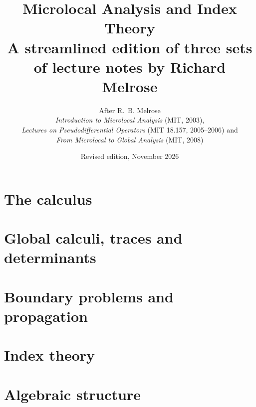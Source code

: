 \documentclass[11pt,openany]{book}
\title{Microlocal Analysis and Index Theory\\[1ex]\large A streamlined edition of three sets of lecture notes by Richard Melrose}
\author{After R.~B. Melrose\\\small \emph{Introduction to Microlocal Analysis} (MIT, 2003),\\\small \emph{Lectures on Pseudodifferential Operators} (MIT 18.157, 2005--2006) and\\\small \emph{From Microlocal to Global Analysis} (MIT, 2008)}
\date{Revised edition, November 2026}
\begin{document}
\frontmatter
\maketitle
\tableofcontents


\mainmatter
\part{The calculus}







\part{Global calculi, traces and determinants}



\part{Boundary problems and propagation}




\part{Index theory}







\part{Algebraic structure}


\appendix























\backmatter

\end{document}
